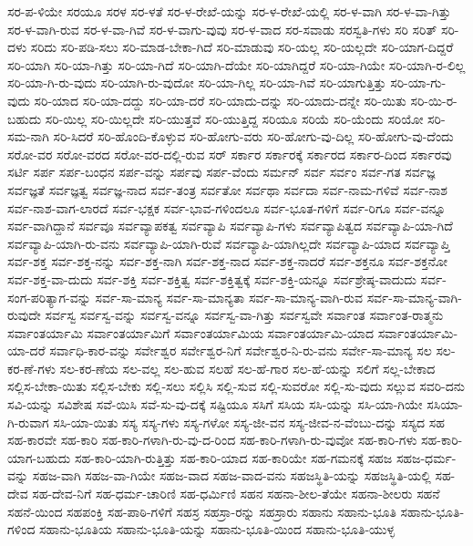 {ಸರ-ಪ-ಳಿಯೇ
ಸರಯೂ
ಸರಳ
ಸರ-ಳತೆ
ಸರ-ಳ-ರೇಖೆ-ಯನ್ನು
ಸರ-ಳ-ರೇಖೆ-ಯಲ್ಲಿ
ಸರ-ಳ-ವಾಗಿ
ಸರ-ಳ-ವಾ-ಗಿತ್ತು
ಸರ-ಳ-ವಾಗಿ-ರುವ
ಸರ-ಳ-ವಾ-ಗಿವೆ
ಸರ-ಳ-ವಾಗು-ವುವು
ಸರ-ಳ-ವಾದ
ಸರ-ಸವಾಡು
ಸರಸ್ವತಿ-ಗಳು
ಸರಿ
ಸರಿತ್
ಸರಿ-ದಳು
ಸರಿದು
ಸರಿ-ಪಡಿ-ಸಲು
ಸರಿ-ಮಾಡ-ಬೇಕಾ-ಗಿದೆ
ಸರಿ-ಮಾಡುವು
ಸರಿ-ಯಲ್ಲ
ಸರಿ-ಯಲ್ಲದೇ
ಸರಿ-ಯಾಗ-ದಿದ್ದರೆ
ಸರಿ-ಯಾಗಿ
ಸರಿ-ಯಾ-ಗಿತ್ತು
ಸರಿ-ಯಾ-ಗಿದೆ
ಸರಿ-ಯಾಗಿ-ದೆಯೇ
ಸರಿ-ಯಾಗಿದ್ದರೆ
ಸರಿ-ಯಾ-ಗಿಯೇ
ಸರಿ-ಯಾಗಿ-ರ-ಲಿಲ್ಲ
ಸರಿ-ಯಾ-ಗಿ-ರು-ವುದು
ಸರಿ-ಯಾಗಿ-ರು-ವುದೋ
ಸರಿ-ಯಾ-ಗಿಲ್ಲ
ಸರಿ-ಯಾ-ಗಿವೆ
ಸರಿ-ಯಾಗುತ್ತಿತ್ತು
ಸರಿ-ಯಾ-ಗು-ವುದು
ಸರಿ-ಯಾದ
ಸರಿ-ಯಾ-ದದ್ದು
ಸರಿ-ಯಾ-ದರೆ
ಸರಿ-ಯಾದು-ದನ್ನು
ಸರಿ-ಯಾದು-ದನ್ನೇ
ಸರಿ-ಯಿತು
ಸರಿ-ಯಿ-ರ-ಬಹುದು
ಸರಿ-ಯಿಲ್ಲ
ಸರಿ-ಯಿಲ್ಲದೇ
ಸರಿ-ಯುತ್ತವೆ
ಸರಿ-ಯುತ್ತಿದ್ದ
ಸರಿಯೂ
ಸರಿಯೆ
ಸರಿ-ಯೆಂದು
ಸರಿಯೋ
ಸರಿ-ಸಮ-ನಾಗಿ
ಸರಿ-ಸಿದರೆ
ಸರಿ-ಹೊಂದಿ-ಕೊಳ್ಳುವ
ಸರಿ-ಹೋಗು-ವರು
ಸರಿ-ಹೋಗು-ವು-ದಿಲ್ಲ
ಸರಿ-ಹೋಗು-ವು-ದೆಂದು
ಸರೋ-ವರ
ಸರೋ-ವರದ
ಸರೋ-ವರ-ದಲ್ಲಿ-ರುವ
ಸರ್
ಸರ್ಕಾರ
ಸರ್ಕಾರಕ್ಕೆ
ಸರ್ಕಾರದ
ಸರ್ಕಾರ-ದಿಂದ
ಸರ್ಕಾರವು
ಸರ್ಟಿ
ಸರ್ಪ
ಸರ್ಪ-ಬಂಧನ
ಸರ್ಪ-ವನ್ನು
ಸರ್ಪವು
ಸರ್ಪ-ವೆಂದು
ಸರ್ಮನ್
ಸರ್ವ
ಸರ್ವಂ
ಸರ್ವ-ಗತ
ಸರ್ವಜ್ಞ
ಸರ್ವಜ್ಞತೆ
ಸರ್ವಜ್ಞತ್ವ
ಸರ್ವಜ್ಞ-ನಾದ
ಸರ್ವ-ತಂತ್ರ
ಸರ್ವತೋ
ಸರ್ವಥಾ
ಸರ್ವದಾ
ಸರ್ವ-ನಾಮ-ಗಳಿವೆ
ಸರ್ವ-ನಾಶ
ಸರ್ವ-ನಾಶ-ವಾಗ-ಲಾರದೆ
ಸರ್ವ-ಭಕ್ಷಕ
ಸರ್ವ-ಭಾವ-ಗಳಿಂದಲೂ
ಸರ್ವ-ಭೂತ-ಗಳಿಗೆ
ಸರ್ವ-ರಿಗೂ
ಸರ್ವ-ವನ್ನೂ
ಸರ್ವ-ವಾಗಿದ್ದಾನೆ
ಸರ್ವವೂ
ಸರ್ವವ್ಯಾಪಕತ್ವ
ಸರ್ವವ್ಯಾಪಿ
ಸರ್ವವ್ಯಾಪಿ-ಗಳು
ಸರ್ವವ್ಯಾಪಿತ್ವದ
ಸರ್ವವ್ಯಾಪಿ-ಯಾ-ಗಿದೆ
ಸರ್ವವ್ಯಾಪಿ-ಯಾಗಿ-ರು-ವನು
ಸರ್ವವ್ಯಾಪಿ-ಯಾಗಿ-ರುವೆ
ಸರ್ವವ್ಯಾಪಿ-ಯಾಗಿಲ್ಲದೇ
ಸರ್ವವ್ಯಾಪಿ-ಯಾದ
ಸರ್ವವ್ಯಾಪ್ತಿ
ಸರ್ವ-ಶಕ್ತ
ಸರ್ವ-ಶಕ್ತ-ನನ್ನು
ಸರ್ವ-ಶಕ್ತ-ನಾಗಿ
ಸರ್ವ-ಶಕ್ತ-ನಾದ
ಸರ್ವ-ಶಕ್ತ-ನಾದರೆ
ಸರ್ವ-ಶಕ್ತನೂ
ಸರ್ವ-ಶಕ್ತನೋ
ಸರ್ವ-ಶಕ್ತ-ವಾ-ದುದು
ಸರ್ವ-ಶಕ್ತಿ
ಸರ್ವ-ಶಕ್ತಿತ್ವ
ಸರ್ವ-ಶಕ್ತಿತ್ವಕ್ಕೆ
ಸರ್ವ-ಶಕ್ತಿ-ಯನ್ನೂ
ಸರ್ವಶ್ರೇಷ್ಠ-ವಾದುದು
ಸರ್ವ-ಸಂಗ-ಪರಿತ್ಯಾಗ-ವನ್ನು
ಸರ್ವ-ಸಾ-ಮಾನ್ಯ
ಸರ್ವ-ಸಾ-ಮಾನ್ಯತಾ
ಸರ್ವ-ಸಾ-ಮಾನ್ಯ-ವಾಗಿ-ರುವ
ಸರ್ವ-ಸಾ-ಮಾನ್ಯ-ವಾಗಿ-ರುವುದೇ
ಸರ್ವಸ್ವ
ಸರ್ವಸ್ವ-ವನ್ನು
ಸರ್ವಸ್ವ-ವನ್ನೂ
ಸರ್ವಸ್ವ-ವಾ-ಗಿತ್ತು
ಸರ್ವಸ್ವವೇ
ಸರ್ವಾಂತ
ಸರ್ವಾಂತ-ರಾತ್ಮನು
ಸರ್ವಾಂತರ್ಯಾಮಿ
ಸರ್ವಾಂತರ್ಯಾಮಿಗೆ
ಸರ್ವಾಂತರ್ಯಾಮಿಯ
ಸರ್ವಾಂತರ್ಯಾಮಿ-ಯಾದ
ಸರ್ವಾಂತರ್ಯಾಮಿ-ಯಾ-ದರೆ
ಸರ್ವಾಧಿ-ಕಾರ-ವನ್ನು
ಸರ್ವೇಶ್ವರ
ಸರ್ವೇಶ್ವರ-ನಿಗೆ
ಸರ್ವೇಶ್ವರ-ನಿ-ರು-ವನು
ಸರ್ವೇ-ಸಾ-ಮಾನ್ಯ
ಸಲ
ಸಲ-ಕರ-ಣೆ-ಗಳು
ಸಲ-ಕರ-ಣೆಯ
ಸಲ-ವಲ್ಲ
ಸಲ-ಹುವ
ಸಲಹೆ
ಸಲ-ಹೆ-ಗಾರ
ಸಲ-ಹೆ-ಯನ್ನು
ಸಲಿಗೆ
ಸಲ್ಲ-ಬೇಕಾದ
ಸಲ್ಲಿಸ-ಬೇಕಾ-ಯಿತು
ಸಲ್ಲಿಸ-ಬೇಕು
ಸಲ್ಲಿ-ಸಲು
ಸಲ್ಲಿಸಿ
ಸಲ್ಲಿ-ಸುವ
ಸಲ್ಲಿ-ಸುವರೋ
ಸಲ್ಲಿ-ಸು-ವುದು
ಸಲ್ಲುವ
ಸವರಿ-ದನು
ಸವಿ-ಯನ್ನು
ಸವಿಶೇಷ
ಸವೆ-ಯಿಸಿ
ಸವೆ-ಸು-ವು-ದಕ್ಕೆ
ಸಷ್ಟಿಯೂ
ಸಸಿಗೆ
ಸಸಿಯ
ಸಸಿ-ಯನ್ನು
ಸಸಿ-ಯಾ-ಗಿಯೇ
ಸಸಿಯಾ-ಗಿ-ರುವಾಗ
ಸಸಿ-ಯಾ-ಯಿತು
ಸಸ್ಯ
ಸಸ್ಯ-ಗಳು
ಸಸ್ಯ-ಗಳೋ
ಸಸ್ಯ-ಜೀ-ವನ
ಸಸ್ಯ-ಜೀವ-ನ-ವೆಂಬು-ದನ್ನು
ಸಸ್ಯದ
ಸಹ
ಸಹ-ಕಾರವೇ
ಸಹ-ಕಾರಿ
ಸಹ-ಕಾರಿ-ಗಳಾಗಿ-ರು-ವು-ದ-ರಿಂದ
ಸಹ-ಕಾರಿ-ಗಳಾಗಿ-ರು-ವುವೋ
ಸಹ-ಕಾರಿ-ಗಳು
ಸಹ-ಕಾರಿ-ಯಾಗ-ಬಹುದು
ಸಹ-ಕಾರಿ-ಯಾಗಿ-ರುತ್ತಿತ್ತು
ಸಹ-ಕಾರಿ-ಯಾದ
ಸಹ-ಕಾರಿಯೇ
ಸಹ-ಗಮನಕ್ಕೆ
ಸಹಜ
ಸಹಜ-ಧರ್ಮ-ವನ್ನು
ಸಹಜ-ವಾಗಿ
ಸಹಜ-ವಾ-ಗಿಯೇ
ಸಹಜ-ವಾದ
ಸಹಜ-ವಾದ-ವನು
ಸಹಜಸ್ಥಿತಿ-ಯನ್ನು
ಸಹಜಸ್ಥಿತಿ-ಯಲ್ಲಿ
ಸಹ-ದೇವ
ಸಹ-ದೇವ-ನಿಗೆ
ಸಹ-ಧರ್ಮ-ಚಾರಿಣಿ
ಸಹ-ಧರ್ಮಿಣಿ
ಸಹನ
ಸಹನಾ-ಶೀಲ-ತೆಯೇ
ಸಹನಾ-ಶೀಲರು
ಸಹನೆ
ಸಹನೆ-ಯಿಂದ
ಸಹಪಂಕ್ತಿ
ಸಹ-ಪಾಠಿ-ಗಳಿಗೆ
ಸಹಸ್ರ
ಸಹಸ್ರಾ-ರನ್ನು
ಸಹಸ್ರಾರು
ಸಹಾನು
ಸಹಾನು-ಭೂತಿ
ಸಹಾನು-ಭೂತಿ-ಗಳಿಂದ
ಸಹಾನು-ಭೂತಿಯ
ಸಹಾನು-ಭೂತಿ-ಯನ್ನು
ಸಹಾನು-ಭೂತಿ-ಯಿಂದ
ಸಹಾನು-ಭೂತಿ-ಯುಳ್ಳ
}
